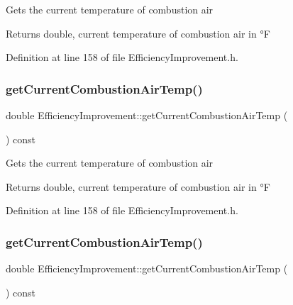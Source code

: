Gets the current temperature of combustion air

\begin{DoxyReturn}{Returns}
double, current temperature of combustion air in °F 
\end{DoxyReturn}


Definition at line 158 of file Efficiency\+Improvement.\+h.

\mbox{\label{class_efficiency_improvement_aa2f9d297f3c31e249c7a8035fd5602f1}} 
\subsubsection{\texorpdfstring{get\+Current\+Combustion\+Air\+Temp()}{getCurrentCombustionAirTemp()}\hspace{0.1cm}{\footnotesize\ttfamily [2/3]}}
{\footnotesize\ttfamily double Efficiency\+Improvement\+::get\+Current\+Combustion\+Air\+Temp (\begin{DoxyParamCaption}{ }\end{DoxyParamCaption}) const\hspace{0.3cm}{\ttfamily [inline]}}

Gets the current temperature of combustion air

\begin{DoxyReturn}{Returns}
double, current temperature of combustion air in °F 
\end{DoxyReturn}


Definition at line 158 of file Efficiency\+Improvement.\+h.

\mbox{\label{class_efficiency_improvement_aa2f9d297f3c31e249c7a8035fd5602f1}} 
\subsubsection{\texorpdfstring{get\+Current\+Combustion\+Air\+Temp()}{getCurrentCombustionAirTemp()}\hspace{0.1cm}{\footnotesize\ttfamily [3/3]}}
{\footnotesize\ttfamily double Efficiency\+Improvement\+::get\+Current\+Combustion\+Air\+Temp (\begin{DoxyParamCaption}{ }\end{DoxyParamCaption}) const\hspace{0.3cm}{\ttfamily [inline]}}

